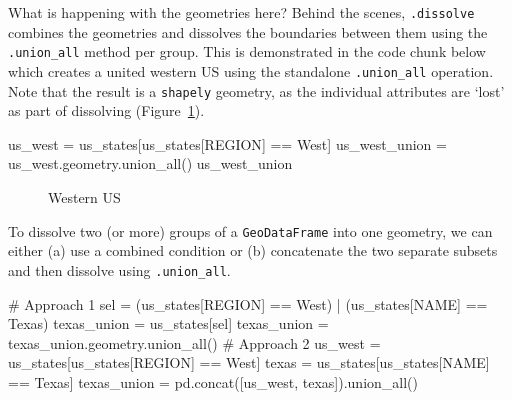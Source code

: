 \documentclass[
  letterpaper,
]{krantz}
\newenvironment{Shaded}{\begin{snugshade}}{\end{snugshade}}
\newcommand{\CommentTok}[1]{\textcolor[rgb]{0.37,0.37,0.37}{#1}}
\newcommand{\NormalTok}[1]{\textcolor[rgb]{0.00,0.23,0.31}{#1}}
\newcommand{\OperatorTok}[1]{\textcolor[rgb]{0.37,0.37,0.37}{#1}}
\newcommand{\StringTok}[1]{\textcolor[rgb]{0.13,0.47,0.30}{#1}}
\begin{document}
What is happening with the geometries here? Behind the scenes,
\texttt{.dissolve} combines the geometries and dissolves the boundaries
between them using the \texttt{.union\_all} method per group. This is
demonstrated in the code chunk below which creates a united western US
using the standalone \texttt{.union\_all} operation. Note that the
result is a \texttt{shapely} geometry, as the individual attributes are
`lost' as part of dissolving (Figure~\ref{fig-dissolve2}).

\begin{Shaded}
\begin{Highlighting}[]
\NormalTok{us\_west }\OperatorTok{=}\NormalTok{ us\_states[us\_states[}\StringTok{\textquotesingle{}REGION\textquotesingle{}}\NormalTok{] }\OperatorTok{==} \StringTok{\textquotesingle{}West\textquotesingle{}}\NormalTok{]}
\NormalTok{us\_west\_union }\OperatorTok{=}\NormalTok{ us\_west.geometry.union\_all()}
\NormalTok{us\_west\_union}
\end{Highlighting}
\end{Shaded}

\begin{figure}[H]


\caption{\label{fig-dissolve2}Western US}

\end{figure}%

To dissolve two (or more) groups of a \texttt{GeoDataFrame} into one
geometry, we can either (a) use a combined condition or (b) concatenate
the two separate subsets and then dissolve using \texttt{.union\_all}.

\begin{Shaded}
\begin{Highlighting}[]
\CommentTok{\# Approach 1}
\NormalTok{sel }\OperatorTok{=}\NormalTok{ (us\_states[}\StringTok{\textquotesingle{}REGION\textquotesingle{}}\NormalTok{] }\OperatorTok{==} \StringTok{\textquotesingle{}West\textquotesingle{}}\NormalTok{) }\OperatorTok{|}\NormalTok{ (us\_states[}\StringTok{\textquotesingle{}NAME\textquotesingle{}}\NormalTok{] }\OperatorTok{==} \StringTok{\textquotesingle{}Texas\textquotesingle{}}\NormalTok{)}
\NormalTok{texas\_union }\OperatorTok{=}\NormalTok{ us\_states[sel]}
\NormalTok{texas\_union }\OperatorTok{=}\NormalTok{ texas\_union.geometry.union\_all()}
\CommentTok{\# Approach 2}
\NormalTok{us\_west }\OperatorTok{=}\NormalTok{ us\_states[us\_states[}\StringTok{\textquotesingle{}REGION\textquotesingle{}}\NormalTok{] }\OperatorTok{==} \StringTok{\textquotesingle{}West\textquotesingle{}}\NormalTok{]}
\NormalTok{texas }\OperatorTok{=}\NormalTok{ us\_states[us\_states[}\StringTok{\textquotesingle{}NAME\textquotesingle{}}\NormalTok{] }\OperatorTok{==} \StringTok{\textquotesingle{}Texas\textquotesingle{}}\NormalTok{]}
\NormalTok{texas\_union }\OperatorTok{=}\NormalTok{ pd.concat([us\_west, texas]).union\_all()}
\end{Highlighting}
\end{Shaded}
\end{document}
